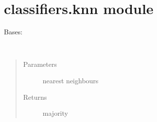 \documentclass[letterpaper,10pt,english]{sphinxmanual}
\begin{document}
\section{classifiers.knn module}
\label{\detokenize{classifiers:classifiers-knn-module}}\label{\detokenize{classifiers:module-classifiers.knn}}

\begin{fulllineitems}
\label{\detokenize{classifiers:classifiers.knn.KNN}}
Bases: 

\begin{fulllineitems}
\label{\detokenize{classifiers:classifiers.knn.KNN.X_train}}
\end{fulllineitems}


\begin{fulllineitems}
\label{\detokenize{classifiers:classifiers.knn.KNN.Y_train}}
\end{fulllineitems}


\begin{fulllineitems}
\label{\detokenize{classifiers:classifiers.knn.KNN.get_majority}}~\begin{quote}\begin{description}
\item[{Parameters}] \leavevmode
{} \textendash{} nearest neighbours

\item[{Returns}] \leavevmode
majority

\end{description}\end{quote}

\end{fulllineitems}



\end{fulllineitems}
\end{document}
